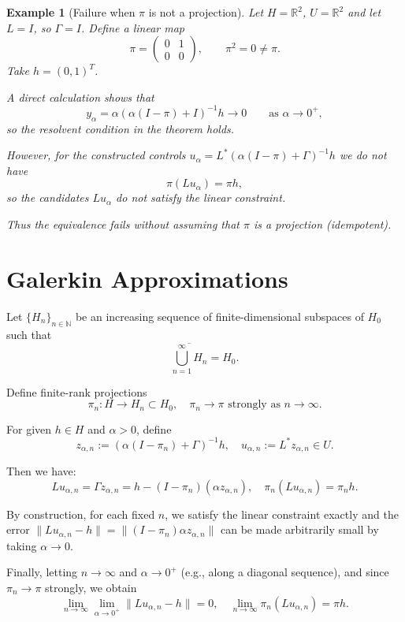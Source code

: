 \documentclass[12pt]{article}
\newtheorem{example}[theorem]{Example}
\begin{document}
	\begin{example}[Failure when \(\pi\) is not a projection]
		Let \(H = \mathbb{R}^{2}\), \(U = \mathbb{R}^{2}\) and let \(L = I\), so \(\Gamma = I\). Define a linear map
		\[
		\pi =
		\begin{pmatrix}
			0 & 1\\
			0 & 0
		\end{pmatrix},
		\qquad
		\pi^{2} = 0 \neq \pi.
		\]
		Take \(h = (0,1)^{T}\).
		
		A direct calculation shows that
		\[
		y_{\alpha} = \alpha(\alpha(I-\pi)+I)^{-1}h \longrightarrow 0
		\qquad\text{as }\alpha \to 0^{+},
		\]
		so the resolvent condition in the theorem holds.
		
		However, for the constructed controls \(u_{\alpha} = L^{*}(\alpha(I-\pi)+\Gamma)^{-1}h\) we do \emph{not} have
		\[
		\pi(Lu_{\alpha}) = \pi h,
		\]
		so the candidates \(Lu_\alpha\) do not satisfy the linear constraint.
		
		Thus the equivalence fails without assuming that \(\pi\) is a projection (idempotent).
	\end{example}
	
	\section{Galerkin Approximations}
	
	Let \(\{H_n\}_{n \in \mathbb{N}}\) be an increasing sequence of finite-dimensional subspaces of \(H_0\) such that
	\[
	\overline{\bigcup_{n=1}^{\infty} H_n} = H_0.
	\]
	
	Define finite-rank projections
	\[
	\pi_n: H \to H_n \subset H_0, \quad \pi_n \to \pi \text{ strongly as } n \to \infty.
	\]
	
	For given \(h \in H\) and \(\alpha > 0\), define
	\[
	z_{\alpha,n} := (\alpha(I-\pi_n)+\Gamma)^{-1} h, \quad
	u_{\alpha,n} := L^* z_{\alpha,n} \in U.
	\]
	
	Then we have:
	\[
	L u_{\alpha,n} = \Gamma z_{\alpha,n} = h - (I-\pi_n)(\alpha z_{\alpha,n}), \quad
	\pi_n (L u_{\alpha,n}) = \pi_n h.
	\]
	
	By construction, for each fixed \(n\), we satisfy the linear constraint exactly and the error \(\|L u_{\alpha,n} - h\| = \|(I-\pi_n) \alpha z_{\alpha,n}\|\) can be made arbitrarily small by taking \(\alpha \to 0\).
	
	Finally, letting \(n \to \infty\) and \(\alpha \to 0^{+}\) (e.g., along a diagonal sequence), and since \(\pi_n \to \pi\) strongly, we obtain
	\[
	\lim_{n\to\infty} \lim_{\alpha \to 0^+} \|L u_{\alpha,n} - h\| = 0, \quad
	\lim_{n\to\infty} \pi_n(L u_{\alpha,n}) = \pi h.
	\]
	
\end{document}
